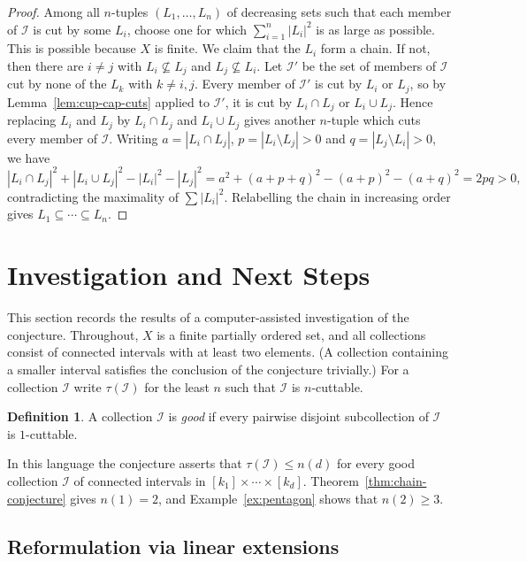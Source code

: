 \documentclass[10pt, a4paper]{article}
\theoremstyle{plain}
\theoremstyle{definition}
\newtheorem{definition}[theorem]{Definition}
\newcommand{\I}{\mathcal{I}}
\begin{document}
\begin{proof}
  Among all $n$-tuples $(L_1,\ldots,L_n)$ of decreasing sets such that each member of
  $\I$ is cut by some $L_i$, choose one for which $\sum_{i=1}^n|L_i|^2$ is as large as
  possible. This is possible because $X$ is finite. We claim that the $L_i$ form a
  chain. If not, then there are $i\ne j$ with $L_i\not\subseteq L_j$ and
  $L_j\not\subseteq L_i$. Let $\I'$ be the set of members of $\I$ cut by none of the
  $L_k$ with $k\ne i,j$. Every member of $\I'$ is cut by $L_i$ or $L_j$, so by
  Lemma~\ref{lem:cup-cap-cuts} applied to $\I'$, it is cut by $L_i\cap L_j$ or
  $L_i\cup L_j$. Hence replacing $L_i$ and $L_j$ by $L_i\cap L_j$ and $L_i\cup L_j$ gives another
  $n$-tuple which cuts every member of $\I$. Writing $a=|L_i\cap L_j|$,
  $p=|L_i\setminus L_j|>0$ and $q=|L_j\setminus L_i|>0$, we have
  \[
    |L_i\cap L_j|^2+|L_i\cup L_j|^2 - |L_i|^2 - |L_j|^2
    = a^2+(a+p+q)^2-(a+p)^2-(a+q)^2 = 2pq > 0,
  \]
  contradicting the maximality of $\sum|L_i|^2$. Relabelling the chain in increasing
  order gives $L_1\subseteq\cdots\subseteq L_n$.
\end{proof}

\section{Investigation and Next Steps}

This section records the results of a computer-assisted investigation of the
conjecture. Throughout, $X$ is a finite partially ordered set, and all collections
consist of connected intervals with at least two elements. (A collection containing a
smaller interval satisfies the conclusion of the conjecture trivially.) For a
collection $\I$ write $\tau(\I)$ for the least $n$ such that $\I$ is $n$-cuttable.

\begin{definition}
  A collection $\I$ is \emph{good} if every pairwise disjoint subcollection of $\I$ is
  $1$-cuttable.
\end{definition}

In this language the conjecture asserts that $\tau(\I)\le n(d)$ for every good
collection $\I$ of connected intervals in $[k_1]\times\cdots\times[k_d]$.
Theorem~\ref{thm:chain-conjecture} gives $n(1)=2$, and Example~\ref{ex:pentagon}
shows that $n(2)\ge 3$.

\subsection{Reformulation via linear extensions}
\end{document}
